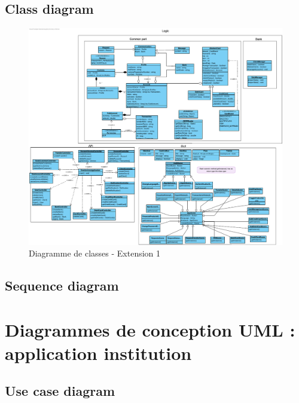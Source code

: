 \documentclass[]{report}
\begin{document}


\newpage

\subsection{Class diagram}

\begin{figure}[h!]
	\centering\includegraphics[width=\linewidth]{img/class-Extension-1.pdf}
	\caption{Diagramme de classes - Extension 1}
\end{figure}



\newpage

\subsection{Sequence diagram}



\newpage



\section{Diagrammes de conception UML : application institution}



\subsection{Use case diagram}
\end{document}
